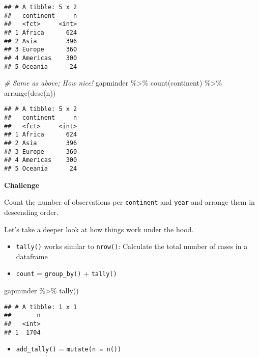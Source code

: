\documentclass[
]{book}
\newenvironment{Shaded}{\begin{snugshade}}{\end{snugshade}}
\newcommand{\CommentTok}[1]{\textcolor[rgb]{0.56,0.35,0.01}{\textit{#1}}}
\newcommand{\FunctionTok}[1]{\textcolor[rgb]{0.00,0.00,0.00}{#1}}
\newcommand{\NormalTok}[1]{#1}
\newcommand{\SpecialCharTok}[1]{\textcolor[rgb]{0.00,0.00,0.00}{#1}}
\providecommand{\tightlist}{%
  \setlength{\itemsep}{0pt}\setlength{\parskip}{0pt}}
\begin{document}
\begin{verbatim}
## # A tibble: 5 x 2
##   continent     n
##   <fct>     <int>
## 1 Africa      624
## 2 Asia        396
## 3 Europe      360
## 4 Americas    300
## 5 Oceania      24
\end{verbatim}

\begin{Shaded}
\begin{Highlighting}[]
\CommentTok{\# Same as above; How nice!}
\NormalTok{gapminder }\SpecialCharTok{\%\textgreater{}\%}
  \FunctionTok{count}\NormalTok{(continent) }\SpecialCharTok{\%\textgreater{}\%}
  \FunctionTok{arrange}\NormalTok{(}\FunctionTok{desc}\NormalTok{(n))}
\end{Highlighting}
\end{Shaded}

\begin{verbatim}
## # A tibble: 5 x 2
##   continent     n
##   <fct>     <int>
## 1 Africa      624
## 2 Asia        396
## 3 Europe      360
## 4 Americas    300
## 5 Oceania      24
\end{verbatim}

\textbf{Challenge}

Count the number of observations per \texttt{continent} and \texttt{year} and arrange them in descending order.

Let's take a deeper look at how things work under the hood.

\begin{itemize}
\item
  \texttt{tally()} works similar to \texttt{nrow()}: Calculate the total number of cases in a dataframe
\item
  \texttt{count} = \texttt{group\_by()} + \texttt{tally()}
\end{itemize}

\begin{Shaded}
\begin{Highlighting}[]
\NormalTok{gapminder }\SpecialCharTok{\%\textgreater{}\%}
  \FunctionTok{tally}\NormalTok{()}
\end{Highlighting}
\end{Shaded}

\begin{verbatim}
## # A tibble: 1 x 1
##       n
##   <int>
## 1  1704
\end{verbatim}

\begin{itemize}
\tightlist
\item
  \texttt{add\_tally()} = \texttt{mutate(n\ =\ n())}
\end{itemize}
\end{document}
